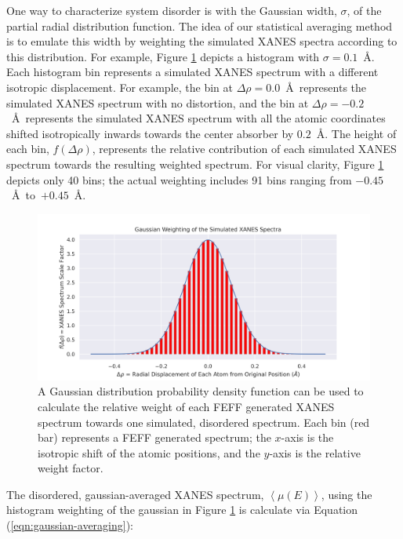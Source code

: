 One way to characterize system disorder is with the Gaussian width, $ \sigma $, of the partial radial distribution function. The idea of our statistical averaging method is to emulate this width by weighting the simulated XANES spectra according to this distribution. For example, Figure \ref{fig:gaussian-weighting-hist} depicts a histogram with $ \sigma=0.1 $~\AA. Each histogram bin represents a simulated XANES spectrum with a different isotropic displacement. For example, the bin at $ \Delta\rho=0.0 $~\AA~represents the simulated XANES spectrum with no distortion, and the bin at $ \Delta\rho=-0.2 $~\AA~represents the simulated XANES spectrum with all the atomic coordinates shifted isotropically inwards towards the center absorber by $ 0.2 $~\AA. The height of each bin, $ f(\Delta\rho) $, represents the relative contribution of each simulated XANES spectrum towards the resulting weighted spectrum. For visual clarity, Figure \ref{fig:gaussian-weighting-hist} depicts only 40 bins; the actual weighting includes 91 bins ranging from $ -0.45 $~\AA~to~$ +0.45 $~\AA.
\begin{figure}[h!]
	\centering
	\includegraphics[width=\linewidth]{Chapters/Figures/gaussian-weighting-hist.png}
	\caption[Simulated Spectrum Gaussian Weighting]{A Gaussian distribution probability density function can be used to calculate the relative weight of each FEFF generated XANES spectrum towards one simulated, disordered spectrum. Each bin (red bar) represents a FEFF generated spectrum; the $x$-axis is the isotropic shift of the atomic positions, and the $y$-axis is the relative weight factor.}
	\label{fig:gaussian-weighting-hist}
\end{figure}

The disordered, gaussian-averaged XANES spectrum, $ \left\langle \mu(E) \right\rangle $, using the histogram weighting of the gaussian in Figure \ref{fig:gaussian-weighting-hist} is calculate via Equation (\ref{eqn:gaussian-averaging}):

